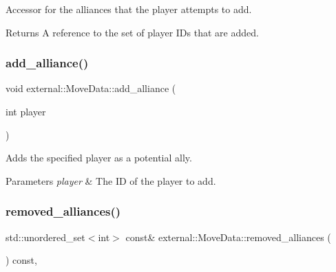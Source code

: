 Accessor for the alliances that the player attempts to add. 

\begin{DoxyReturn}{Returns}
A reference to the set of player I\+Ds that are added. 
\end{DoxyReturn}
\mbox{\label{classexternal_1_1_move_data_ae3a11d3c816e165ac2ceff604f191d32}} 
\subsubsection{\texorpdfstring{add\+\_\+alliance()}{add\_alliance()}}
{\footnotesize\ttfamily void external\+::\+Move\+Data\+::add\+\_\+alliance (\begin{DoxyParamCaption}\item[{int}]{player }\end{DoxyParamCaption})\hspace{0.3cm}{\ttfamily [inline]}}



Adds the specified player as a potential ally. 


\begin{DoxyParams}{Parameters}
{\em player} & The ID of the player to add. \\
\hline
\end{DoxyParams}
\mbox{\label{classexternal_1_1_move_data_ace46398597a4ba0139c7c043d0d8d5be}} 
\subsubsection{\texorpdfstring{removed\+\_\+alliances()}{removed\_alliances()}}
{\footnotesize\ttfamily std\+::unordered\+\_\+set$<$int$>$ const\& external\+::\+Move\+Data\+::removed\+\_\+alliances (\begin{DoxyParamCaption}{ }\end{DoxyParamCaption}) const\hspace{0.3cm}{\ttfamily [inline]}, {\ttfamily [noexcept]}}



